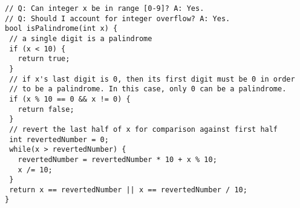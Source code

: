 \documentclass{report}
\begin{document}
\begin{spacing}{1.4}
\begin{enumerate}[leftmargin=*]
    \begin{lstlisting}
// Q: Can integer x be in range [0-9]? A: Yes.
// Q: Should I account for integer overflow? A: Yes.
bool isPalindrome(int x) {
 // a single digit is a palindrome
 if (x < 10) {
   return true;
 }
 // if x's last digit is 0, then its first digit must be 0 in order
 // to be a palindrome. In this case, only 0 can be a palindrome.
 if (x % 10 == 0 && x != 0) {
   return false;
 }
 // revert the last half of x for comparison against first half
 int revertedNumber = 0;
 while(x > revertedNumber) {
   revertedNumber = revertedNumber * 10 + x % 10;
   x /= 10;
 }
 return x == revertedNumber || x == revertedNumber / 10;
}
\end{lstlisting}

    




\end{enumerate}
\end{spacing}
\end{document}
